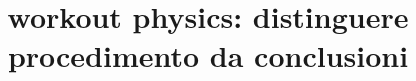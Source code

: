 \documentclass[oneside,20pt,fleqn,extrafontsizes]{memoir}
\title{workout physics: distinguere procedimento da conclusioni}
\begin{document}
\pagestyle{mystyle}%
\renewcommand*{\contentsname}{\label{toc}{Table of Contents}}%
\maketitle
\listoftodos
\tableofcontents*
\end{document}
